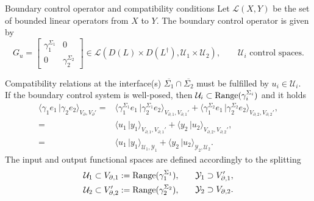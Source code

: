 \documentclass[aspectratio=169]{beamer}
\newcommand{\dualpr}[3][]{\ensuremath{\langle #2 \, \vert #3 \rangle_{#1}}}
\begin{document}
\begin{frame}{Boundary control operator and compatibility conditions}
	Let $\mathcal{L}(X, Y)$ be the set of bounded linear operators from $X$ to $Y$.
	The boundary control operator is given by
\begin{equation*}
	G_u = \begin{bmatrix}
		\gamma_1^{\Sigma_1} & 0 \\
		0 & \gamma_2^{\Sigma_2}
	\end{bmatrix} \in \mathcal{L}(D(L) \times D(L^\dag), \mathcal{U}_1 \times \mathcal{U}_2), \qquad \mathcal{U}_i \text{ control spaces.}
\end{equation*}


Compatibility relations at the interface(s) $\overline{\Sigma_1} \cap \overline{\Sigma_2}$ must be fulfilled by $u_i \in \mathcal{U}_i$.\\
 If the boundary control system is well-posed, then $\mathcal{U}_i \subset {\rm Range}( \gamma_i^{\Sigma_i} )$ and it holds
\begin{equation*}
	\begin{aligned}
		\dualpr[V_\partial,V_\partial']{\gamma_1 e_1}{\gamma_2 e_2} =& \dualpr[V_{\partial, 1},V_{\partial, 1}']{\gamma_1^{\Sigma_1} e_1}{\gamma_2^{\Sigma_1} e_2} + \dualpr[V_{\partial, 2},V_{\partial, 2}']{\gamma_1^{\Sigma_2} e_1}{\gamma_2^{\Sigma_2} e_2}, \\
		=& \dualpr[V_{\partial, 1},V_{\partial, 1}']{u_1}{y_1} + \dualpr[V_{\partial, 2},V_{\partial, 2}']{y_2}{u_2}, \\
		=& \dualpr[\mathcal{U}_1, \mathcal{Y}_1]{u_1}{y_1} + \dualpr[\mathcal{Y}_2, \mathcal{U}_2]{y_2}{u_2}.
	\end{aligned}
\end{equation*}
The input and output functional spaces are defined accordingly to the splitting
\begin{equation*}
	\begin{aligned}
		\mathcal{U}_1 \subset V_{\partial, 1} := {\rm Range}( \gamma_1^{\Sigma_1} ), \\
		\mathcal{U}_2 \subset V_{\partial, 2}' := {\rm Range}( \gamma_2^{\Sigma_2} ),
	\end{aligned} \qquad
	\begin{aligned}
		\mathcal{Y}_1 \supset V_{\partial, 1}', \\
		\mathcal{Y}_2 \supset V_{\partial, 2}.
	\end{aligned}
\end{equation*}

\end{frame}
\end{document}
